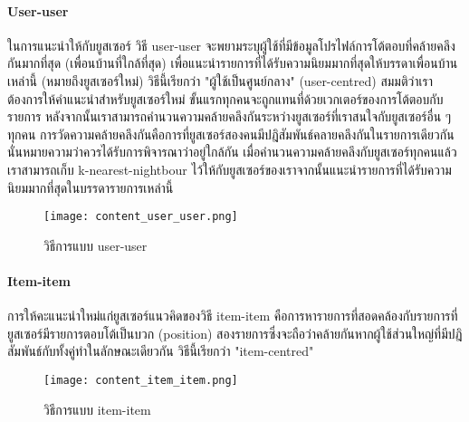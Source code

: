 \paragraph{User-user}
ในการแนะนำให้กับยูสเซอร์ วิธี user-user จะพยามระบุผู้ใช้ที่มีข้อมูลโปรไฟล์การโต้ตอบที่คล้ายคลึงกันมากที่สุด (เพื่อนบ้านที่ใกล้ที่สุด) เพื่อแนะนำรายการที่ได้รับความนิยมมากที่สุดให้บรรดาเพื่อนบ้านเหล่านี้ (หมายถึงยูสเซอร์ใหม่) วิธีนี้เรียกว่า "ผู้ใช้เป็นศูนย์กลาง" (user-centred)
สมมติว่าเราต้องการให้คำแนะนำสำหรับยูสเซอร์ใหม่ ขั้นแรกทุกคนจะถูกแทนที่ด้วยเวกเตอร์ของการโต้ตอบกับรายการ หลังจากนั้นเราสามารถคำนวนความคล้ายคลึงกันระหว่างยูสเซอร์ที่เราสนใจกับยูสเซอร์อื่น ๆ ทุกคน การวัดความคล้ายคลึงกันคือการที่ยูสเซอร์สองคนมีปฎิสัมพันธ์คลายคลึงกันในรายการเดียวกันนั่นหมายความว่าควรได้รับการพิจารณาว่าอยู่ใกล้กัน เมื่อคำนวนความคล้ายคลึงกับยูสเซอร์ทุกคนแล้ว เราสามารถเก็บ k-nearest-nightbour ไว้ให้กับยูสเซอร์ของเราจากนั้นแนะนำรายการที่ได้รับความนิยมมากที่สุดในบรรดารายการเหล่านี้
\newline
\begin{figure}[!h]
  \centering
  \texttt{[image: content\_user\_user.png]}  
  \caption{\cite[baptiste]{baptiste} วิธีการแบบ user-user}
  \label{Fig:cell-and-block}
\end{figure}
\paragraph{Item-item}
การให้คะแนะนำใหม่แก่ยูสเซอร์แนวคิดของวิธี item-item คือการหารายการที่สอดคล้องกับรายการที่ยูสเซอร์มีรายการตอบโต้เป็นบวก (position) สองรายการซึ่งจะถือว่าคล้ายกันหากผู้ใช้ส่วนใหญ่ที่มีปฎิสัมพันธ์กับทั้งคู่ทำในลักษณะเดียวกัน วิธีนี้เรียกว่า "item-centred"
\newline
\begin{figure}[!h]
  \centering
  \texttt{[image: content\_item\_item.png]}  
  \caption{\cite[baptiste]{baptiste} วิธีการแบบ item-item}
  \label{Fig:cell-and-block}
\end{figure}
